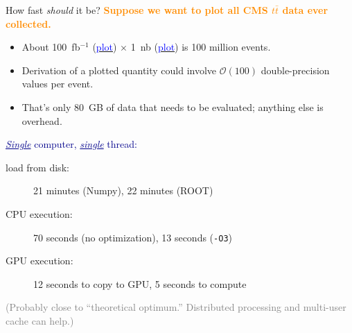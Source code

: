 \documentclass{beamer}
\begin{document}
\begin{frame}{How fast {\it should} it be?}
\vspace{0.3 cm}
\textcolor{darkorange}{\bf Suppose we want to plot all CMS $t\bar{t}$ data ever collected.}
\begin{itemize}
\item About 100~fb$^{-1}$ (\href{http://cms-service-lumi.web.cern.ch/cms-service-lumi/publicplots/int_lumi_cumulative_pp_1.png}{\textcolor{blue}{plot}}) $\times$ 1~nb (\href{https://atlas.web.cern.ch/Atlas/GROUPS/PHYSICS/CombinedSummaryPlots/SM/ATLAS_p_SMSummary_SqrtS_Zoom/ATLAS_p_SMSummary_SqrtS_Zoom.png}{\textcolor{blue}{plot}}) is 100 million events.
\item Derivation of a plotted quantity could involve $\mathcal{O}(100)$ double-precision values per event.
\item That's only 80~GB of data that needs to be evaluated; anything else is overhead.
\end{itemize}

\vspace{0.5 cm}
\textcolor{darkblue}{{\it \underline{Single}} computer, {\it \underline{single}} thread:}

\vspace{0.1 cm}
\begin{description}
\item[load from disk:] 21 minutes (Numpy), 22 minutes (ROOT)
\item[CPU execution:] 70 seconds (no optimization), 13 seconds ({\tt -O3})
\item[GPU execution:] 12 seconds to copy to GPU, 5 seconds to compute
\end{description}

\vspace{0.1 cm}
\textcolor{gray}{(Probably close to ``theoretical optimum.'' Distributed processing and multi-user cache can help.)}
\end{frame}
\end{document}
